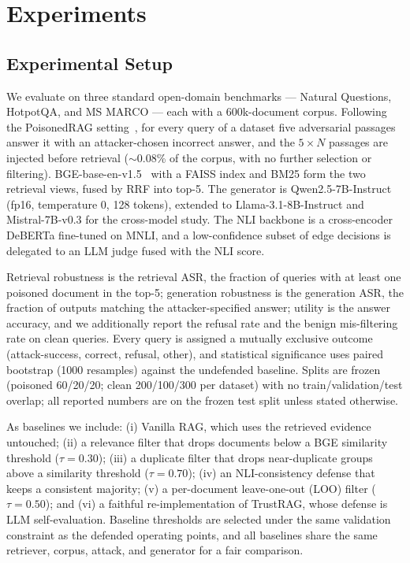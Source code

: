 \documentclass[sigconf]{acmart}
\begin{document}
\section{Experiments}

\subsection{Experimental Setup}

We evaluate on three standard open-domain benchmarks --- Natural Questions, HotpotQA, and MS MARCO --- each with a 600k-document corpus. Following the PoisonedRAG setting~\cite{zou2024poisonedrag}, for every query of a dataset five adversarial passages answer it with an attacker-chosen incorrect answer, and the $5\times N$ passages are injected before retrieval ($\sim$0.08\% of the corpus, with no further selection or filtering). BGE-base-en-v1.5~\cite{xiao2023bge} with a FAISS index and BM25 form the two retrieval views, fused by RRF into top-5. The generator is Qwen2.5-7B-Instruct (fp16, temperature 0, 128 tokens), extended to Llama-3.1-8B-Instruct and Mistral-7B-v0.3 for the cross-model study. The NLI backbone is a cross-encoder DeBERTa fine-tuned on MNLI, and a low-confidence subset of edge decisions is delegated to an LLM judge fused with the NLI score.

Retrieval robustness is the retrieval ASR, the fraction of queries with at least one poisoned document in the top-5; generation robustness is the generation ASR, the fraction of outputs matching the attacker-specified answer; utility is the answer accuracy, and we additionally report the refusal rate and the benign mis-filtering rate on clean queries. Every query is assigned a mutually exclusive outcome (attack-success, correct, refusal, other), and statistical significance uses paired bootstrap (1000 resamples) against the undefended baseline. Splits are frozen (poisoned 60/20/20; clean 200/100/300 per dataset) with no train/validation/test overlap; all reported numbers are on the frozen test split unless stated otherwise.

As baselines we include: (i) Vanilla RAG, which uses the retrieved evidence untouched; (ii) a relevance filter that drops documents below a BGE similarity threshold ($\tau=0.30$); (iii) a duplicate filter that drops near-duplicate groups above a similarity threshold ($\tau=0.70$); (iv) an NLI-consistency defense that keeps a consistent majority; (v) a per-document leave-one-out (LOO) filter ($\tau=0.50$); and (vi) a faithful re-implementation of TrustRAG, whose defense is LLM self-evaluation. Baseline thresholds are selected under the same validation constraint as the defended operating points, and all baselines share the same retriever, corpus, attack, and generator for a fair comparison.
\end{document}

